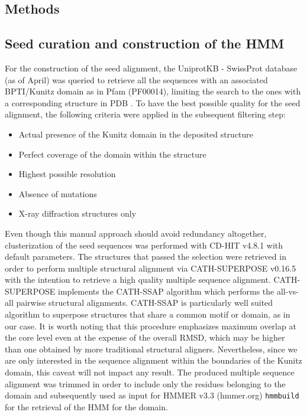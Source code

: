 \documentclass[nocrop]{bioinfo}
\begin{document}
\enlargethispage{12pt}
\begin{methods}
\section{Methods}
\subsection{Seed curation and construction of the HMM}

For the construction of the seed alignment, the UniprotKB \citep{uniprot2019} - SwissProt database (as of April) was queried to retrieve all the sequences with an associated BPTI/Kunitz domain as in Pfam \citep{pfam2019} (PF00014), limiting the search to the ones with a corresponding structure in PDB \citep{pdb2000}.
To have the best possible quality for the seed alignment, the following criteria were applied in the subsequent filtering step:

\begin{itemize}
    \item Actual presence of the Kunitz domain in the deposited structure 
    \item Perfect coverage of the domain within the structure 
    \item Highest possible resolution 
    \item Absence of mutations 
    \item X-ray diffraction structures only
\end{itemize}
\vspace{-3ex}

Even though this manual approach should avoid redundancy altogether, clusterization of the seed sequences was performed with CD-HIT v4.8.1 \citep{cdhit2006} with default parameters.  
The structures that passed the selection were retrieved in order to perform multiple structural alignment via CATH-SUPERPOSE v0.16.5 with the intention to retrieve a high quality multiple sequence alignment. 
CATH-SUPERPOSE implements the CATH-SSAP \citep{taylorProteinStructureAlignment1989} algorithm which performs the all-vs-all pairwise structural alignments.
CATH-SSAP is particularly well suited algorithm to superpose structures that share a common motif or domain, as in our case.
It is worth noting that this procedure emphasizes maximum overlap at the core level even at the expense of the overall RMSD, which may be higher than one obtained by more traditional structural aligners.
Nevertheless, since we are only interested in the sequence alignment within the boundaries of the Kunitz domain, this caveat will not impact any result. 
The produced multiple sequence alignment was trimmed in order to include only the residues belonging to the domain and subsequently used as input for HMMER v3.3 (hmmer.org) \texttt{hmmbuild} for the retrieval of the HMM for the domain.  


\end{methods}
\end{document}
